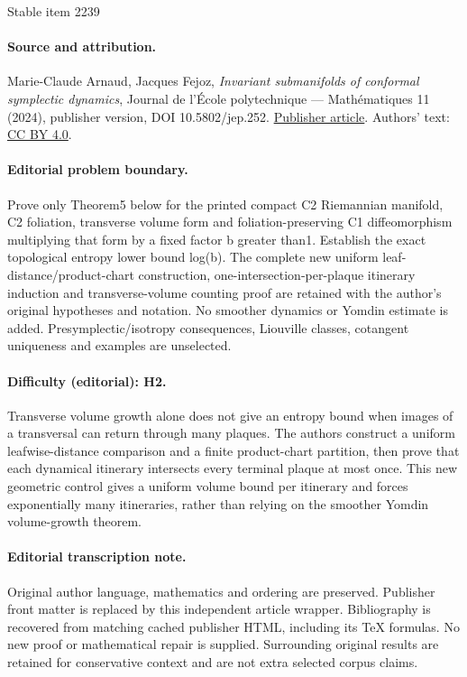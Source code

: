 \documentclass[11pt]{article}
\numberwithin{equation}{section}
\numberwithin{figure}{section}
\numberwithin{table}{section}
\theoremstyle{definition}
\begin{document}
\begin{center}{\Large Stable item 2239}\end{center}
\paragraph{Source and attribution.}
Marie-Claude Arnaud, Jacques Fejoz, \emph{Invariant submanifolds of conformal symplectic dynamics}, Journal de l’École polytechnique — Mathématiques 11 (2024), publisher version, DOI 10.5802/jep.252. \href{https://jep.centre-mersenne.org/articles/10.5802/jep.252/}{Publisher article}. Authors' text: \href{https://creativecommons.org/licenses/by/4.0/}{CC BY 4.0}.
\paragraph{Editorial problem boundary.}
Prove only Theorem5 below for the printed compact C2 Riemannian manifold, C2 foliation, transverse volume form and foliation-preserving C1 diffeomorphism multiplying that form by a fixed factor b greater than1. Establish the exact topological entropy lower bound log(b). The complete new uniform leaf-distance/product-chart construction, one-intersection-per-plaque itinerary induction and transverse-volume counting proof are retained with the author's original hypotheses and notation. No smoother dynamics or Yomdin estimate is added. Presymplectic/isotropy consequences, Liouville classes, cotangent uniqueness and examples are unselected.
\paragraph{Difficulty (editorial): H2.}
Transverse volume growth alone does not give an entropy bound when images of a transversal can return through many plaques. The authors construct a uniform leafwise-distance comparison and a finite product-chart partition, then prove that each dynamical itinerary intersects every terminal plaque at most once. This new geometric control gives a uniform volume bound per itinerary and forces exponentially many itineraries, rather than relying on the smoother Yomdin volume-growth theorem.
\paragraph{Editorial transcription note.}
Original author language, mathematics and ordering are preserved. Publisher front matter is replaced by this independent article wrapper. Bibliography is recovered from matching cached publisher HTML, including its TeX formulas. No new proof or mathematical repair is supplied. Surrounding original results are retained for conservative context and are not extra selected corpus claims.
\clearpage
\end{document}
